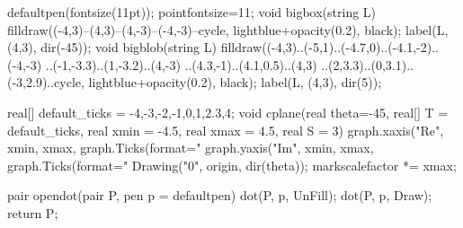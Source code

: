 \theoremstyle{definition}
\newtheorem{claim}[theorem]{Claim}
\newtheorem{definition}[theorem]{Definition}
\newtheorem{fact}[theorem]{Fact}
\newtheorem{remark}[theorem]{Remark}
\newtheorem{abuse}[theorem]{Abuse of Notation}

\newtheorem{problem}{Problem}[chapter]
\renewcommand{\theproblem}{\thechapter\Alph{problem}}
\newtheorem{sproblem}[problem]{Problem}
\newtheorem{dproblem}[problem]{Problem}
\renewcommand{\thesproblem}{\theproblem$^{\star}$}
\renewcommand{\thedproblem}{\theproblem$^{\dagger}$}
\newcommand{\listhack}{$\empty$\vspace{-2em}}

\usepackage{answers}
\renewcommand{\solutionextension}{out}
\renewenvironment{answeritem}[1]{\item[\bf #1.]}{}

\reversemarginpar
\newcommand{\prechili}{\vspace*{0.3em}\hspace*{1.5em}}
\newcommand{\nochili}{\hspace*{1.5em}}
\newcommand{\chili}{\texttt{[image: media/chili.png]}}
\newcommand{\gim}{\marginpar{\prechili\nochili\nochili\chili}}
\newcommand{\yod}{\marginpar{\prechili\nochili\chili\chili}}
\newcommand{\kurumi}{\marginpar{\prechili\chili\chili\chili}}

\makeatletter
\usepackage{etoolbox}
%
\makeatother
\setcounter{tocdepth}{1}

\renewcommand{\theasy}{\thechapter\Alph{asy}}
\begin{asydef}
	defaultpen(fontsize(11pt));
	pointfontsize=11;
	void bigbox(string L) {
		filldraw((-4,3)--(4,3)--(4,-3)--(-4,-3)--cycle,
			lightblue+opacity(0.2), black);
		label(L, (4,3), dir(-45));
	}
	void bigblob(string L) {
		filldraw((-4,3)..(-5,1)..(-4.7,0)..(-4.1,-2)..(-4,-3)
			..(-1,-3.3)..(1,-3.2)..(4,-3)
			..(4.3,-1)..(4.1,0.5)..(4,3)
			..(2,3.3)..(0,3.1)..(-3,2.9)..cycle,
			lightblue+opacity(0.2), black);
		label(L, (4,3), dir(5));
	}

	real[] default_ticks = {-4,-3,-2,-1,0,1,2.3,4};
	void cplane(real theta=-45, real[] T = default_ticks, real xmin = -4.5, real xmax = 4.5, real S = 3) {
		graph.xaxis("Re", xmin, xmax, graph.Ticks(format="%
		graph.yaxis("Im", xmin, xmax, graph.Ticks(format="%
		Drawing("0", origin, dir(theta));
		markscalefactor *= xmax;
	}

	pair opendot(pair P, pen p = defaultpen) {
		dot(P, p, UnFill);
		dot(P, p, Draw);
		return P;
	}
\end{asydef}
\def\asydir{asy}


